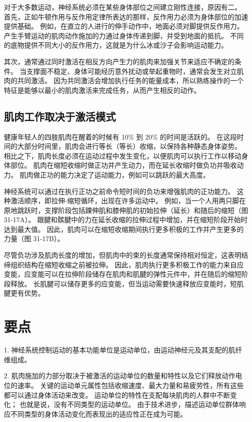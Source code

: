 对于大多数运动，神经系统必须在某些身体部位之间建立刚性连接，原因有二。 首先，正如牛顿作用与反作用定律所表达的那样，反作用力必须为身体部位的加速提供基础。 例如，在直立的人进行的伸手动作中，地面必须对脚提供反作用力。 产生手臂运动的肌肉动作施加的力通过身体传递到脚，并受到地面的抵抗。 不同的底物提供不同大小的反作用力，这就是为什么冰或沙子会影响运动能力。

其次，通常通过同时激活在相反方向产生力的肌肉来加强关节来适应不确定的条件。 当支撑面不稳定、身体可能经历意外扰动或举起重物时，通常会发生对立肌肉的共同激活。 因为共同激活会增加执行任务的能量成本，所以熟练操作的一个特征是能够以最小的肌肉激活来完成任务，从而产生相反的动作。

\subsection{肌肉工作取决于激活模式}

健康年轻人的四肢肌肉在醒着的时候有 10\% 到 20\% 的时间是活跃的。 在这段时间的大部分时间里，肌肉会进行等长（等长）收缩，以保持各种静态身体姿势。 相比之下，肌肉长度必须在运动过程中发生变化，以便肌肉可以执行工作以移动身体部位。 肌肉在缩短收缩时做正功并产生动力，而在延长收缩时做负功并吸收动力。 肌肉做正功的能力决定了运动能力，例如可以跳跃的最大高度。

神经系统可以通过在执行正功之前命令短时间的负功来增强肌肉的正功能力。 这种激活顺序，即拉伸-缩短循环，出现在许多运动中。 例如，当一个人用两只脚在原地跳跃时，支撑阶段包括踝伸肌和膝伸肌的初始拉伸（延长）和随后的缩短（图 31-17A）。 跟腱和髌腱中的力在延长收缩的拉伸过程中增加，并在缩短阶段开始时达到最大值。 因此，肌肉可以在缩短收缩期间执行更多积极的工作并产生更多的力量（图 31-17B）。

尽管负功涉及肌肉长度的增加，但肌肉中的束的长度通常保持相对恒定，这表明结缔组织结构在缩短收缩之前被拉伸。 因此，肌肉执行更多积极工作的能力来自应变能，应变能可以在拉伸阶段储存在肌肉和肌腱的弹性元件中，并在随后的缩短阶段释放。 长肌腱可以储存更多的应变能，但当运动需要快速释放应变能时，短肌腱更有优势。

\section{要点}
1. 神经系统控制运动的基本功能单位是运动单位，由运动神经元及其支配的肌纤维组成。 

2. 肌肉施加的力部分取决于被激活的运动单位的数量和特性以及它们释放动作电位的速率。 关键的运动单元属性包括收缩速度、最大力量和易疲劳性，所有这些都可以通过身体活动来改变。 运动单位的特性在支配每块肌肉的人群中不断变化； 也就是说，没有不同类型的运动单位。 由于技术进步，描述运动单位群体响应不同类型的身体活动变化而表现出的适应性正在成为可能。 

